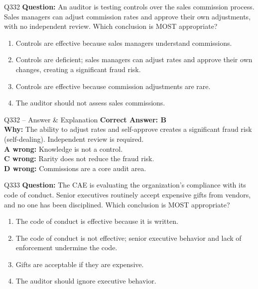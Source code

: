 \documentclass[aspectratio=169,10pt]{beamer}
\begin{document}
	\begin{frame}[t]{Q332}
		\small
		\textbf{Question:} An auditor is testing controls over the sales commission process. Sales managers can adjust commission rates and approve their own adjustments, with no independent review. Which conclusion is MOST appropriate?
		\begin{enumerate}[label=\Alph*.,itemsep=1pt,topsep=2pt]
			\item Controls are effective because sales managers understand commissions.
			\item Controls are deficient; sales managers can adjust rates and approve their own changes, creating a significant fraud risk.
			\item Controls are effective because commission adjustments are rare.
			\item The auditor should not assess sales commissions.
		\end{enumerate}
	\end{frame}
	
	\begin{frame}[t]{Q332 -- Answer \& Explanation}
		\small
		\textbf{Correct Answer: B} \\[4pt]
		\textbf{Why:} The ability to adjust rates and self-approve creates a significant fraud risk (self-dealing). Independent review is required. \\[4pt]
		\textbf{A wrong:} Knowledge is not a control. \\[2pt]
		\textbf{C wrong:} Rarity does not reduce the fraud risk. \\[2pt]
		\textbf{D wrong:} Commissions are a core audit area.
	\end{frame}
	
	\begin{frame}[t]{Q333}
		\small
		\textbf{Question:} The CAE is evaluating the organization's compliance with its code of conduct. Senior executives routinely accept expensive gifts from vendors, and no one has been disciplined. Which conclusion is MOST appropriate?
		\begin{enumerate}[label=\Alph*.,itemsep=1pt,topsep=2pt]
			\item The code of conduct is effective because it is written.
			\item The code of conduct is not effective; senior executive behavior and lack of enforcement undermine the code.
			\item Gifts are acceptable if they are expensive.
			\item The auditor should ignore executive behavior.
		\end{enumerate}
	\end{frame}
	
\end{document}
